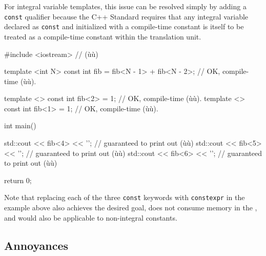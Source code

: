 \noindent For integral variable templates, this issue can be resolved simply by adding a \lstinline!const! qualifier because the C++ Standard requires that any integral variable declared as \lstinline!const! and initialized with a compile-time constant is itself to be treated as a compile-time constant within the translation unit. 

\begin{emcppslisting}
#include <iostream>  // (ù{}ù)

template <int N>
const int fib = fib<N - 1> + fib<N - 2>;  // OK, compile-time (ù{}ù).

template <> const int fib<2> = 1;         // OK, compile-time (ù{}ù).
template <> const int fib<1> = 1;         // OK, compile-time (ù{}ù).

int main()
{
    std::cout << fib<4> << '\n';  // guaranteed to print out (ù{}ù)
    std::cout << fib<5> << '\n';  // guaranteed to print out (ù{}ù)
    std::cout << fib<6> << '\n';  // guaranteed to print out (ù{}ù)

    return 0;
}
\end{emcppslisting}
    
\noindent Note that replacing each of the three \lstinline!const! keywords with
\lstinline!constexpr! in the example above also achieves the
desired goal, does not consume memory in the , and would also be applicable to non-integral constants.

\subsection[Annoyances]{Annoyances}\label{annoyances}

